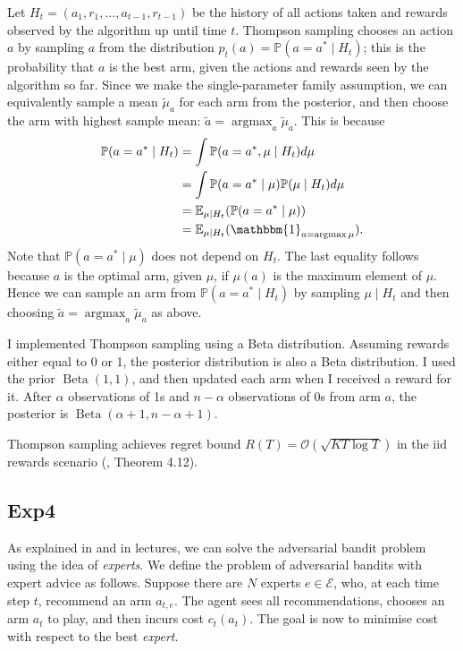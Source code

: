 \documentclass[10pt]{article}
\newcommand{\EE}{\mathbb{E}}
\newcommand{\PP}{\mathbb{P}}
\newcommand{\indicator}{\mathbbm{1}}
\newcommand{\bigoh}{\mathcal{O}}
\DeclareMathOperator{\Beta}{Beta}
\DeclareMathOperator{\argmax}{argmax}
\begin{document}
Let $H_t = (a_1, r_1, \ldots, a_{t-1}, r_{t-1})$ be the history of all actions
taken and rewards observed by the algorithm up until time $t$. Thompson sampling
chooses an action $a$ by sampling $a$ from the distribution $p_t(a) = \PP(a =
a^* \mid H_t)$; this is the probability that $a$ is the best arm, given the
actions and rewards seen by the algorithm so far. Since we make the
single-parameter family assumption, we can equivalently sample a mean
$\tilde{\mu}_a$ for each arm from the posterior, and then choose the arm with
highest sample mean: $\tilde{a} = \argmax_a \tilde{\mu}_a$. This is because
\begin{align*}
    \PP(a = a^* \mid H_t) &= \int \PP(a = a^*, \mu \mid H_t) d \mu \\
    &= \int \PP(a = a^* \mid  \mu) \PP(\mu \mid H_t) d \mu \\
    &= \EE_{\mu \mid H_t} (\PP(a = a^* \mid \mu)) \\
    &= \EE_{\mu \mid H_t} (\indicator_{a = \argmax{\mu}}).
\end{align*}
Note that $\PP(a = a^* \mid \mu)$ does not depend on $H_t$. The last equality
follows because $a$ is the optimal arm, given $\mu$, if $\mu(a)$ is the maximum
element of $\mu$. Hence we can sample an arm from $\PP(a = a^* \mid H_t)$ by
sampling $\mu \mid H_t$ and then choosing $\tilde{a} = \argmax_a \tilde{\mu}_a$ as above.

I implemented Thompson sampling using a Beta distribution. Assuming rewards
either equal to 0 or 1, the posterior distribution is also a Beta distribution.
I used the prior $\Beta(1,1)$, and then updated each arm when I received a reward
for it. After $\alpha$ observations of 1s and $n - \alpha$ observations of 0s
from arm $a$, the posterior is $\Beta(\alpha + 1, n - \alpha + 1)$.

Thompson sampling achieves regret bound $R(T) = \bigoh(\sqrt{KT \log T})$ in the
iid rewards scenario (\cite{Slivkins}, Theorem 4.12).

\subsection{Exp4}

As explained in \cite{Slivkins} and in lectures, we can solve the adversarial
bandit problem using the idea of \emph{experts}. We define the problem of
adversarial bandits with expert advice as follows. Suppose there are $N$ experts
$e \in \mathcal{E}$, who, at each time step $t$, recommend an arm $a_{t,e}$. The
agent sees all recommendations, chooses an arm $a_t$ to play, and then incurs
cost $c_t(a_t)$. The goal is now to minimise cost with respect to the best
\emph{expert}.
\end{document}

